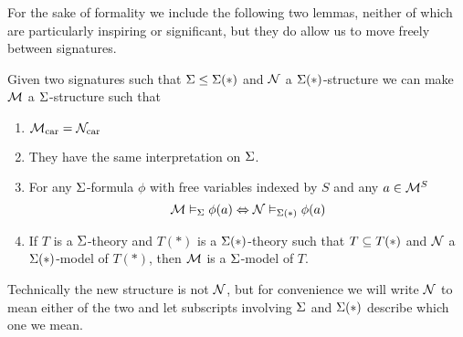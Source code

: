For the sake of formality we include the following two lemmas, 
neither of which are particularly inspiring or significant,
but they do allow us to move freely between signatures.
\begin{lem}
    Given two signatures such that 
    $\Sigma \leq \Sigma(*)$ and
    $\mathcal{N}$ a $\Sigma(*)$-structure we can make 
    $\mathcal{M}$ a $\Sigma$-structure such that
    \begin{enumerate}
        \item ${\mathcal{M}}_\mathrm{car} = {\mathcal{N}}_\mathrm{car}$
        \item They have the same interpretation on $\Sigma$.
        \item For any $\Sigma$-formula $\phi$ with free variables indexed by $S$
            and any $a \in \mathcal{M}^S$
            \[\mathcal{M} \vDash_{\Sigma} \phi(a) \Leftrightarrow \mathcal{N} \vDash_{\Sigma(*)} \phi(a)\]
        \item If $T$ is a $\Sigma$-theory and $T(*)$ is a $\Sigma(*)$-theory 
            such that $T \subseteq T(*)$ and $\mathcal{N}$ a $\Sigma(*)$-model of $T(*)$,
            then $\mathcal{M}$ is a $\Sigma$-model of $T$.
    \end{enumerate}
    Technically the new structure is not $\mathcal{N}$,
    but for convenience we will write 
    $\mathcal{N}$ to mean either of the two and let subscripts involving 
    $\Sigma$ and $\Sigma(*)$ describe which one we mean.
\end{lem}
